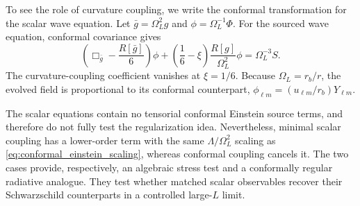 \documentclass[
 aps,
 prd,
 reprint,
 superscriptaddress,
 nofootinbib,
 longbibliography
]{revtex4-2}
\begin{document}
To see the role of curvature coupling, we write the conformal transformation for the scalar wave equation.  Let
$\bar g=\Omega_L^2 g$ and $\phi=\Omega_L^{-1}\Phi$.  For the sourced wave equation,
conformal covariance gives
\begin{equation}
 \left(\Box_{\bar g}-\frac{R[\bar g]}6\right)\phi
 +\left(\frac16-\xi\right)\frac{R[g]}{\Omega_L^2}\phi
 =\Omega_L^{-3}S.
 \label{eq:conformal_source_transform}
\end{equation}
The curvature-coupling coefficient vanishes at $\xi=1/6$.  Because
$\Omega_L=r_b/r$, the evolved field is proportional to its conformal
counterpart, $\phi_{\ell m}=(u_{\ell m}/r_b)Y_{\ell m}$.

The scalar equations contain no tensorial conformal Einstein source terms,
and therefore do not fully test the regularization idea.  Nevertheless, minimal scalar coupling has a lower-order term with the same $\Lambda/\Omega_L^2$ scaling as \eqref{eq:conformal_einstein_scaling}, whereas conformal coupling cancels
it.  The two cases provide, respectively, an algebraic stress test and a
conformally regular radiative analogue.  They test whether matched scalar
observables recover their Schwarzschild counterparts in a controlled
large-$L$ limit.
\end{document}

